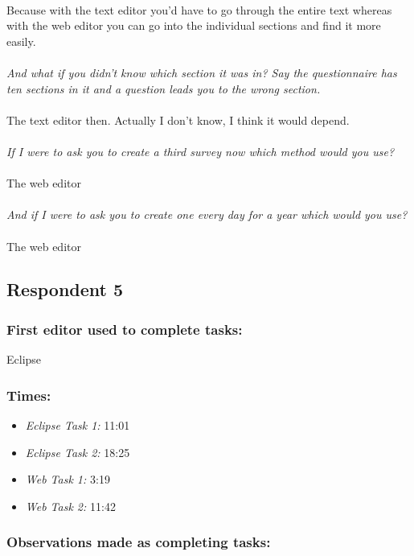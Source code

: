 \documentclass{report}
\begin{document}
\\
Because with the text editor you'd have to go through the entire text whereas with the web editor you can go into the individual sections and find it more easily.
\\
\\
\textit{And what if you didn't know which section it was in? Say the questionnaire has ten sections in it and a question leads you to the wrong section.}
\\
\\
The text editor then. Actually I don't know, I think it would depend.
\\
\\
\textit{If I were to ask you to create a third survey now which method would you use?}
\\
\\
The web editor
\\
\\
\textit{And if I were to ask you to create one every day for a year which would you use?}
\\
\\
The web editor
\subsection{Respondent 5}
\subsubsection*{First editor used to complete tasks:} Eclipse
\subsubsection*{Times:}
\begin{itemize}
\item \emph{Eclipse Task 1:} 11:01
\item \emph{Eclipse Task 2:} 18:25
\item \emph{Web Task 1:} 3:19
\item \emph{Web Task 2:} 11:42
\end{itemize}
\subsubsection*{Observations made as completing tasks:}
\end{document}

